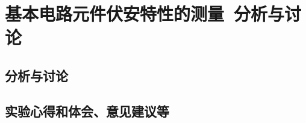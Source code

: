 \documentclass[dvipsnames, svgnames,a4paper,11pt]{article}
\newcommand{\exname}{基本电路元件伏安特性的测量}%
\begin{document}
\section{\exname\ \textbf{分析与讨论}}
\subsection{分析与讨论}
\subsection{实验心得和体会、意见建议等}

\clearpage
%
%


\appendix
\appendixpage
\addappheadtotoc
%
%
	
	

\end{document}
